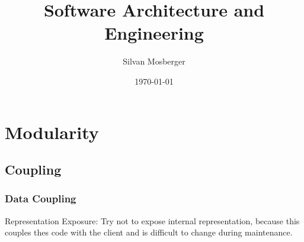 \documentclass[11pt]{article}
\author{Silvan Mosberger}
\date{\today}
\title{Software Architecture and Engineering}
\begin{document}
\maketitle
\tableofcontents


\section{Modularity}
\label{sec:orgaf68fef}

\subsection{Coupling}
\label{sec:orgadda459}

\subsubsection{Data Coupling}
\label{sec:org4cc4e34}

Representation Exposure: Try not to expose internal representation, because this couples thes code with the client and is difficult to change during maintenance.
\end{document}
